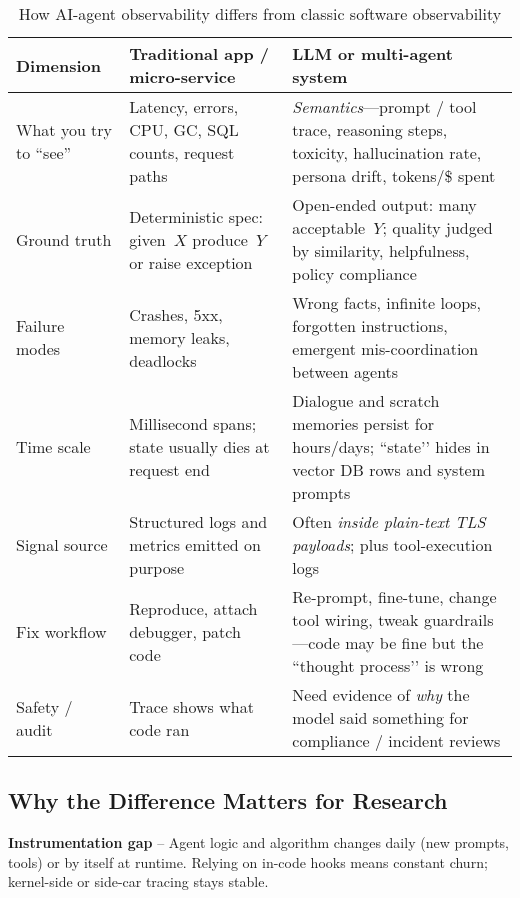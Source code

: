 \documentclass[sigplan,screen，review,9pt]{acmart}
\begin{document}
\begin{table*}[t]
  \caption{How AI-agent observability differs from classic software observability}
  \label{tab:diff}
  \begin{tabularx}{\linewidth}{@{}>{\raggedright\arraybackslash}p{2.85cm}X X@{}}
    \toprule
    \textbf{Dimension} &
    \textbf{Traditional app / micro-service} &
    \textbf{LLM or multi-agent system} \\
    \midrule
    What you try to “see” &
    Latency, errors, CPU, GC, SQL counts, request paths &
    \emph{Semantics}—prompt / tool trace, reasoning steps, toxicity, hallucination rate, persona drift, tokens/\$ spent \\
    Ground truth &
    Deterministic spec: given~$X$ produce~$Y$ or raise exception &
    Open-ended output: many acceptable~$Y$; quality judged by similarity, helpfulness, policy compliance \\
    Failure modes &
    Crashes, 5xx, memory leaks, deadlocks &
    Wrong facts, infinite loops, forgotten instructions, emergent mis-coordination between agents \\
    Time scale &
    Millisecond spans; state usually dies at request end &
    Dialogue and scratch memories persist for hours/days; “state’’ hides in vector DB rows and system prompts \\
    Signal source &
    Structured logs and metrics emitted on purpose &
    Often \emph{inside plain-text TLS payloads}; plus tool-execution logs \\
    Fix workflow &
    Reproduce, attach debugger, patch code &
    Re-prompt, fine-tune, change tool wiring, tweak guardrails—code may be fine but the “thought process’’ is wrong \\
    Safety / audit &
    Trace shows what code ran &
    Need evidence of \emph{why} the model said something for compliance / incident reviews \\
    \bottomrule
  \end{tabularx}
\end{table*}

\subsection*{Why the Difference Matters for Research}
\textbf{Instrumentation gap} – Agent logic and algorithm changes daily (new prompts, tools) or by itself at runtime. Relying on in-code hooks means constant churn; kernel-side or side-car tracing stays stable.
    
\end{document}
